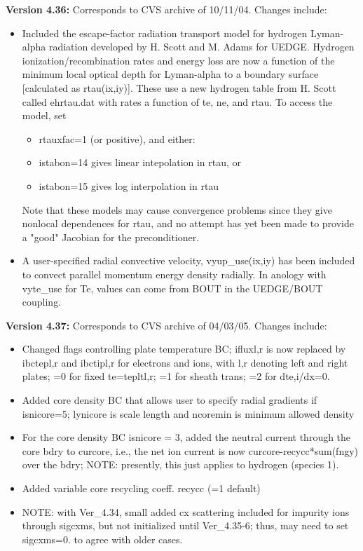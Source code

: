 \documentclass [12pt]{article}
\begin{document}
\noindent\textbf{Version 4.36:} Corresponds to CVS archive of 10/11/04.  
Changes include:
\begin{itemize}
   \item Included the escape-factor radiation transport model for
          hydrogen Lyman-alpha radiation developed by H. Scott and M.
          Adams for UEDGE.  Hydrogen ionization/recombination rates 
          and energy loss are now a function of the minimum local 
          optical depth for Lyman-alpha  to a boundary surface
          [calculated as rtau(ix,iy)].  These use a new hydrogen table
          from H. Scott called ehrtau.dat with rates a function of te, 
          ne, and rtau. To access the model, set
         \begin{itemize}
              \item rtauxfac=1 (or positive), and either:
              \item istabon=14 gives linear intepolation in rtau, or
              \item istabon=15 gives log interpolation in rtau
         \end{itemize}
          Note that these models may cause convergence problems
          since they give nonlocal dependences for rtau, and no attempt
          has yet been made to provide a "good" Jacobian for the 
          preconditioner.
   \item A user-specified radial convective velocity, vyup\_use(ix,iy)
          has been included to convect parallel momentum energy density
          radially.  In anology with vyte\_use for Te, values can come
          from BOUT in the UEDGE/BOUT coupling.
\end{itemize}

\noindent\textbf{Version 4.37:} Corresponds to CVS archive of 04/03/05.  
Changes include:
\begin{itemize}
   \item Changed flags controlling plate temperature BC; ifluxl,r is
	  now replaced by ibctepl,r and ibctipl,r for electrons and 
 	  ions, with l,r denoting left and right plates; =0 for fixed
	  te=tepltl,r; =1 for sheath trans; =2 for dte,i/dx=0.
   \item Added core density BC that allows user to specify radial
	  gradients if isnicore=5; lynicore is scale length and
	  ncoremin is minimum allowed density
   \item For the core density BC isnicore = 3, added the neutral 
	  current through the core bdry to curcore, i.e., the net ion
	  current is now curcore-recycc*sum(fngy) over the bdry; 
	  NOTE: presently, this just applies to hydrogen (species 1).
   \item Added variable core recycling coeff. recycc (=1 default)
   \item NOTE: with Ver\_4.34, small added cx scattering included for
	  impurity ions through sigcxms, but not initialized until 
	  Ver\_4.35-6; thus, may need to set sigcxms=0. to agree with
	  older cases.
\end{itemize}
\end{document}
